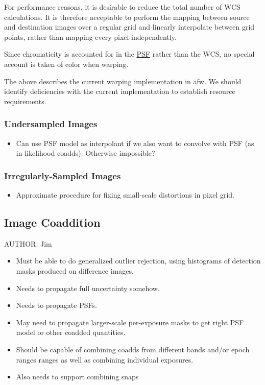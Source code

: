 For performance reasons, it is desirable to reduce the total number of WCS calculations. It is therefore acceptable to perform the mapping between source and destination images over a regular grid and linearly interpolate between grid points, rather than mapping every pixel independently.

Since chromaticity is accounted for in the \hyperref[sec:spPSF]{PSF} rather than the WCS, no special account is taken of color when warping.

\begin{note}
The above describes the current warping implementation in afw. We should identify deficiencies with the current implementation to establish resource requirements.
\end{note}

\subsubsection{Undersampled Images}
\label{sec:acUndersampledWarping}
\begin{itemize}
\item Can use PSF model as interpolant if we also want to convolve with PSF (as in likelihood coadds).  Otherwise impossible?
\end{itemize}
\subsubsection{Irregularly-Sampled Images}
\label{sec:acFixPixelAreaVariations}
\begin{itemize}
\item Approximate procedure for fixing small-scale distortions in pixel grid.
\end{itemize}

\subsection{Image Coaddition}
\label{sec:acCoaddition}
AUTHOR: Jim
\begin{itemize}
\item Must be able to do generalized outlier rejection, using histograms of detection masks produced on difference images.
\item Needs to propagate full uncertainty somehow.
\item Needs to propagate PSFs.
\item May need to propagate larger-scale per-exposure masks to get right PSF model or other coadded quantities.
\item Should be capable of combining coadds from different bands and/or epoch ranges ranges as well as combining individual exposures.
\item Also needs to support combining snaps
\end{itemize}

